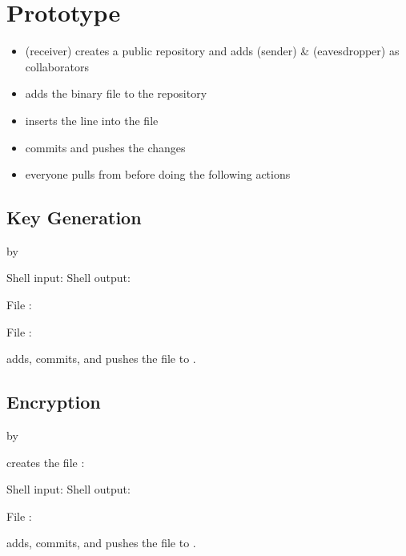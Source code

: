 \section{Prototype}

\begin{itemize}
\item \bob{} (receiver)
  creates a public \github{} repository and
  adds \alice{} (sender) \& \eve{} (eavesdropper)
  as collaborators
\item \bob{} adds the binary file \cryout{}
  to the repository
\item \bob{} inserts the line 
  into the file 
\item \bob{} commits and pushes the changes
\item everyone pulls from \github{}
  before doing the following actions
\end{itemize}


\subsection{Key Generation}
by \bob \bigskip

Shell input: \generatekeysindemo
Shell output: \generatekeysoutdemo

File \private{\bobdemo}:
\codestt{}

File \public{\bobdemo}:
\codestt{}

\bob{} adds, commits, and pushes
the file \public{\bobdemo} to \github.


\subsection{Encryption}
by \alice \bigskip

\alice{} creates the file \private{\alicedemo}:
\codestt{}

Shell input: \encryptindemo
Shell output: \encryptoutdemo

File \public{\alicedemo}:
\codestt{}

\alice{} adds, commits, and pushes
the file \public{\alicedemo} to \github.

